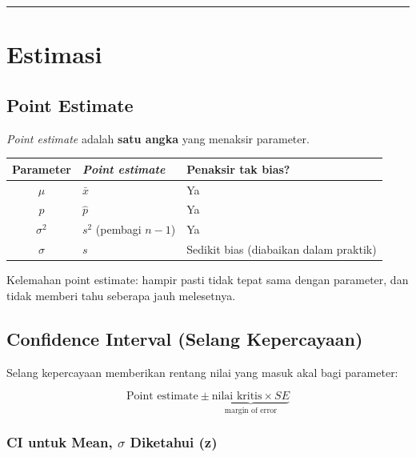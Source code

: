 \documentclass[
  indonesian,
  letterpaper,
]{book}
\newcounter{none} %
\begin{document}
\begin{center}\rule{0.5\linewidth}{0.5pt}\end{center}


\chapter{Estimasi}\label{estimasi}

\section{Point Estimate}\label{point-estimate}

\emph{Point estimate} adalah \textbf{satu angka} yang menaksir
parameter.

{\def\LTcaptype{none} %
\begin{longtable}[]{@{}cll@{}}
\toprule\noalign{}
Parameter & \emph{Point estimate} & Penaksir tak bias? \\
\midrule\noalign{}
\endhead
\bottomrule\noalign{}
\endlastfoot
\(\mu\) & \(\bar{x}\) & Ya \\
\(p\) & \(\hat{p}\) & Ya \\
\(\sigma^2\) & \(s^2\) (pembagi \(n-1\)) & Ya \\
\(\sigma\) & \(s\) & Sedikit bias (diabaikan dalam praktik) \\
\end{longtable}
}

Kelemahan point estimate: hampir pasti tidak tepat sama dengan
parameter, dan tidak memberi tahu seberapa jauh melesetnya.

\section{Confidence Interval (Selang
Kepercayaan)}\label{confidence-interval-selang-kepercayaan}

Selang kepercayaan memberikan rentang nilai yang masuk akal bagi
parameter:

\[\text{Point estimate} \pm \underbrace{\text{nilai kritis} \times SE}_{\text{margin of error}}\]

\subsection{\texorpdfstring{CI untuk Mean, \(\sigma\) Diketahui
(z)}{CI untuk Mean, \textbackslash sigma Diketahui (z)}}\label{ci-untuk-mean-sigma-diketahui-z}
\end{document}
